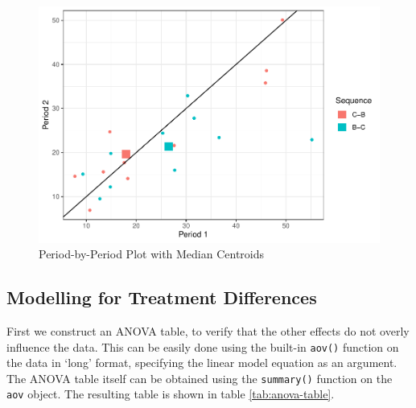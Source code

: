 \begin{figure}
\centering
\includegraphics{ch4_files/figure-latex/centroids-median-1.pdf}
\caption{Period-by-Period Plot with Median Centroids}
\end{figure}

\subsection{Modelling for Treatment
Differences}\label{modelling-for-treatment-differences}

First we construct an ANOVA table, to verify that the other effects do
not overly influence the data. This can be easily done using the
built-in \texttt{aov()} function on the data in `long' format,
specifying the linear model equation as an argument. The ANOVA table
itself can be obtained using the \texttt{summary()} function on the
\texttt{aov} object. The resulting table is shown in table
\ref{tab:anova-table}.

\begin{Shaded}
\begin{Highlighting}[]
\OtherTok{\textless{}{-}} \SpecialCharTok{\textasciitilde{}}\SpecialCharTok{+}\SpecialCharTok{+}\SpecialCharTok{+}\SpecialCharTok{\%\textgreater{}\%}
  \NormalTok{()}
\end{Highlighting}
\end{Shaded}

